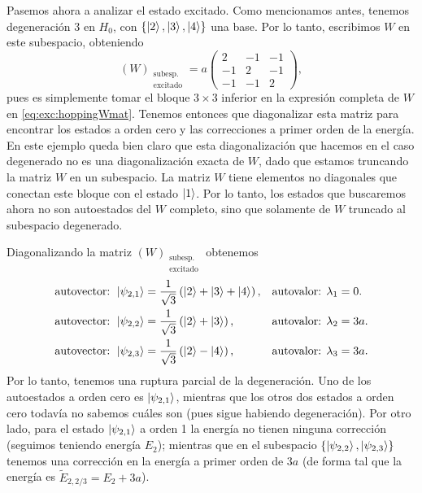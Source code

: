 \documentclass[10pt, a4paper]{article}
\numberwithin{equation}{subsection}
\begin{document}
\bigbreak

Pasemos ahora a analizar el estado excitado. Como mencionamos antes, tenemos
degeneración 3 en $H_0$, con $\set{\ket{2}, \ket{3}, \ket{4}}$ una base. Por lo
tanto, escribimos $W$ en este subespacio, obteniendo
\begin{equation}
  \left(W\right)_{\substack{\text{subesp.}\\\text{excitado}}}
  = a\begin{pmatrix}
     2  & -1  & -1  \\
    -1  &  2  & -1  \\
    -1  & -1  &  2
  \end{pmatrix},
\end{equation}
pues es simplemente tomar el bloque $3\times3$ inferior en la expresión
completa de $W$ en \eqref{eq:exc:hoppingWmat}. Tenemos entonces que
diagonalizar esta matriz para encontrar los estados a orden cero y las
correcciones a primer orden de la energía. En este ejemplo queda bien claro que
esta diagonalización que hacemos en el caso degenerado no es una diagonalización
exacta de $W$, dado que estamos truncando la matriz $W$ en un subespacio. La
matriz $W$ tiene elementos no diagonales que conectan este bloque con el estado
$\ket{1}$. Por lo tanto, los estados que buscaremos ahora no son autoestados
del $W$ completo, sino que solamente de $W$ truncado al subespacio
degenerado.

Diagonalizando la matriz
$\left(W\right)_{\substack{\text{subesp.}\\\text{excitado}}}$ obtenemos
\begin{align}
  \text{autovector: } \ket{\psi_{2,1}} &= \frac{1}{\sqrt{3}} \left( \ket{2} +
    \ket{3} + \ket{4} \right), & \text{autovalor: } \lambda_1 &= 0. \\
  \text{autovector: } \ket{\psi_{2,2}} &= \frac{1}{\sqrt{3}} \left( \ket{2} +
    \ket{3} \right), & \text{autovalor: } \lambda_2 &= 3a. \\
  \text{autovector: } \ket{\psi_{2,3}} &= \frac{1}{\sqrt{3}} \left( \ket{2} -
    \ket{4} \right), & \text{autovalor: } \lambda_3 &= 3a.
\end{align}
Por lo tanto, tenemos una ruptura parcial de la degeneración. Uno de los
autoestados a orden cero es $\ket{\psi_{2,1}}$, mientras que los otros dos
estados a orden cero todavía no sabemos cuáles son (pues sigue habiendo
degeneración). Por otro lado, para el estado $\ket{\psi_{2,1}}$ a orden 1 la
energía no tienen ninguna corrección (seguimos teniendo energía $E_2$);
mientras que en el subespacio $\set{\ket{\psi_{2,2}}, \ket{\psi_{2,3}}}$
tenemos una corrección en la energía a primer orden de $3a$ (de forma tal que
la energía es $\tilde{E}_{2,2/3} = E_2 + 3a$).
\end{document}
